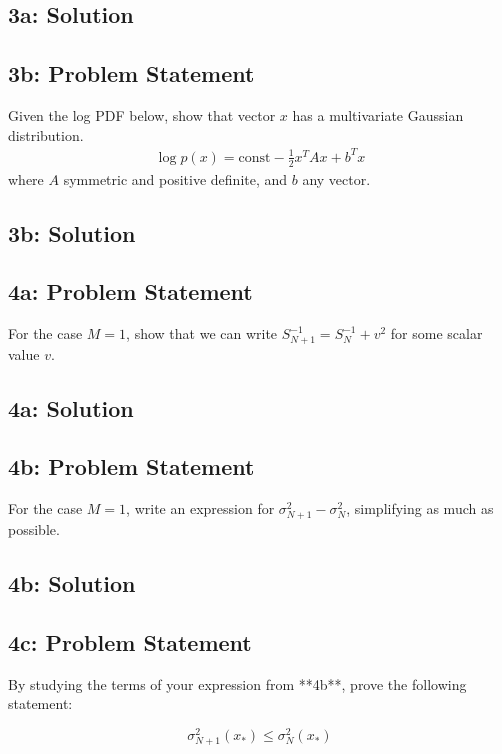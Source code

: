 \documentclass[12pt]{article}
\newcommand{\officialdirections}[1]{{\color{blue} #1}}
\begin{document}
\subsection{3a: Solution}




\newpage
\officialdirections{
\subsection*{3b: Problem Statement}
Given the log PDF below, show that vector $x$ has a multivariate Gaussian distribution.
\begin{align}
\log p(x) = \text{const} - \frac{1}{2} x^T A x + b^T x
\end{align}
where $A$ symmetric and positive definite, and $b$ any vector.
}


\subsection{3b: Solution}




\newpage
\officialdirections{
\subsection*{4a: Problem Statement}
For the case $M=1$, show that we can write $S_{N+1}^{-1} = S_N^{-1} + v^2$ for some scalar value $v$.
}

\subsection{4a: Solution}




\newpage
\officialdirections{
\subsection*{4b: Problem Statement}
For the case $M=1$, write an expression for $\sigma^2_{N+1} - \sigma^2_{N}$, simplifying as much as possible. 
}

\subsection{4b: Solution}



\newpage
\officialdirections{
\subsection*{4c: Problem Statement}
By studying the terms of your expression from **4b**, prove the following statement:

$$
\sigma_{N+1}^2(x_*) \leq \sigma_N^2(x_*)
$$
}
\end{document}
